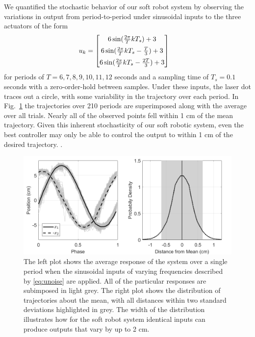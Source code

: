 We quantified the stochastic behavior of our soft robot system by observing the variations in output from period-to-period under sinusoidal inputs to the three actuators of the form
\begin{align} 
    u_k &= \begin{bmatrix} 6 \sin ( \frac{2 \pi}{T} k T_s ) + 3 \vspace{5pt} \\ 
    6 \sin ( \frac{2 \pi}{T} k T_s - \frac{T}{3} ) + 3 \vspace{5pt} \\ 
    6 \sin ( \frac{2 \pi}{T} k T_s  - \frac{2T}{3}) + 3\end{bmatrix}
    \label{eq:unoise}
\end{align}
for periods of $T = 6,7,8,9,10,11,12$ seconds and a sampling time of $T_s = 0.1$ seconds with a zero-order-hold between samples. 
Under these inputs, the laser dot traces out a circle, with some variability in the trajectory over each period.
In Fig.~\ref{fig:noise} the trajectories over 210 periods are superimposed along with the average over all trials.
Nearly all of the observed points fell within 1 cm of the mean trajectory.
Given this inherent stochasticity of our soft robotic system, even the best controller may only be able to control the output to within 1 cm of the desired trajectory.
.

\begin{figure}
    \centering
    \includegraphics[width=\linewidth]{figures/noise.png}
    \caption{The left plot shows the average response of the system over a single period when the sinusoidal inputs of varying frequencies described by \eqref{eq:unoise} are applied. All of the particular responses are subimposed in light grey.
    The right plot shows the distribution of trajectories about the mean, with all distances within two standard deviations highlighted in grey. The width of the distribution illustrates how for the soft robot system identical inputs can produce outputs that vary by up to 2 cm.}
    \label{fig:noise}
\end{figure}

